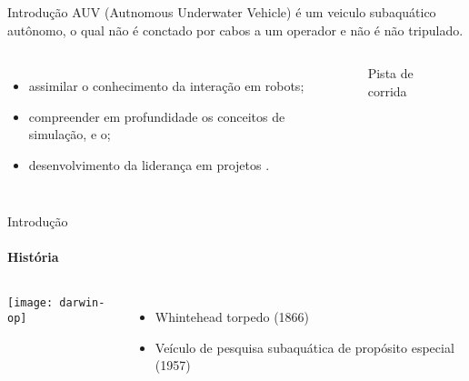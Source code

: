 \begin{frame}[t]{Introdução} 
    \transdissolve[duration=0.5]
    AUV (Autnomous Underwater Vehicle) é um veiculo subaquático autônomo, o qual não é conctado por cabos 
    a um operador e não é não tripulado.


        \begin{columns}[t]
                \begin{itemize}
                    \item assimilar o conhecimento da interação em robots;
                    \item compreender em profundidade os conceitos de simulação, e o;
                    \item desenvolvimento da liderança em projetos \cite{Mohan2015}.
                \end{itemize}
            \begin{center}
                \begin{figure}
                    \caption{Pista de corrida \cite{agostini2007}}
                \end{figure}
            \end{center}
        \end{columns}
\end{frame}
\begin{frame}[t]{Introdução}
    \transboxout[duration=0.5]
    \framesubtitle{História}
    \begin{columns}
            \texttt{[image: darwin-op]}
            \begin{itemize}
               \item Whintehead torpedo (1866)
               \item Veículo de pesquisa subaquática de propósito especial (1957)
            \end{itemize}
    \end{columns}
\end{frame}
